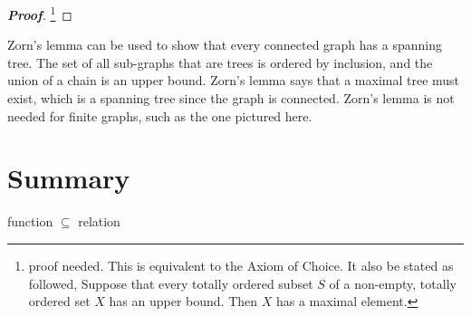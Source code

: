\begin{proof}[\bf Proof]
\footnote{proof needed. This is equivalent to the Axiom of Choice. It also be stated as followed, Suppose that every totally ordered subset $S$ of a non-empty, totally ordered set $X$ has an upper bound. Then $X$ has a maximal
element.}
\end{proof}

\begin{remark}
Zorn's lemma can be used to show that every connected graph has a spanning tree. The set of all sub-graphs that are trees is ordered by inclusion, and the union of a chain is an upper bound. Zorn's lemma says that a maximal tree must exist, which is a spanning tree since the graph is connected. Zorn's lemma is not needed for finite graphs, such as the one pictured here.
\end{remark}



\section{Summary}

function $\subseteq$ relation
